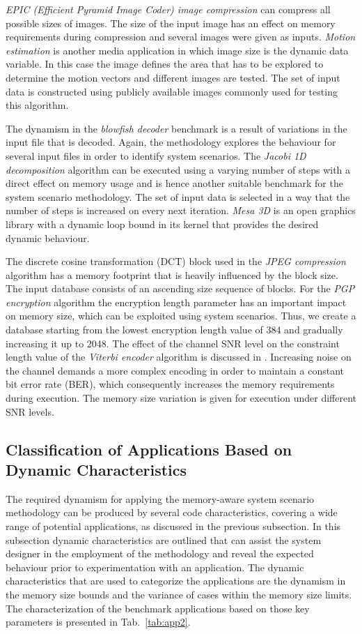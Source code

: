 \documentclass[smallcondensed]{svjour3}
\begin{document}
\textit{EPIC (Efficient Pyramid Image Coder) image compression} can compress all possible sizes of images. 
The size of the input image has an effect on memory requirements during compression and several images were given as inputs. 
\textit{Motion estimation} is another media application in which image size is the dynamic data variable. 
In this case the image defines the area that has to be explored to determine the motion vectors and different images are tested. 
The set of input data is constructed using publicly available images commonly used for testing this algorithm.

The dynamism in the \textit{blowfish decoder} benchmark is a result of variations in the input file that is decoded. 
Again, the methodology explores the behaviour for several input files in order to identify system scenarios. 
The \textit{Jacobi 1D decomposition} algorithm can be executed using a varying number of steps with a direct effect on memory usage and is hence another suitable benchmark for the system scenario methodology. 
The set of input data is selected in a way that the number of steps is increased on every next iteration. 
\textit{Mesa 3D} is an open graphics library with a dynamic loop bound in its kernel that provides the desired dynamic behaviour. 

The discrete cosine transformation (DCT) block used in the \textit{JPEG compression} algorithm has a memory footprint that is heavily influenced by the block size. 
The input database consists of an ascending size sequence of blocks. 
For the \textit{PGP encryption} algorithm the encryption length parameter has an important impact on memory size, which can be exploited using system scenarios. 
Thus, we create a database starting from the lowest encryption length value of 384 and gradually increasing it up to 2048. 
The effect of the channel SNR level on the constraint length value of the \textit{Viterbi encoder} algorithm is discussed in \cite{Fil12}. 
Increasing noise on the channel demands a more complex encoding in order to maintain a constant bit error rate (BER), which consequently increases the memory requirements during execution. 
The memory size variation is given for execution under different SNR levels.  

\subsection{Classification of Applications Based on Dynamic Characteristics}
\label{sec:categorisation}
The required dynamism for applying the memory-aware system scenario methodology can be produced by several code characteristics, covering a wide range of potential applications, as discussed in the previous subsection. 
In this subsection dynamic characteristics are outlined that can assist the system designer in the employment of the methodology and reveal the expected behaviour prior to experimentation with an application. 
The dynamic characteristics that are used to categorize the applications are the dynamism in the memory size bounds and the variance of cases within the memory size limits.
The characterization of the benchmark applications based on those key parameters is presented in Tab.~\ref{tab:app2}.
\end{document}
